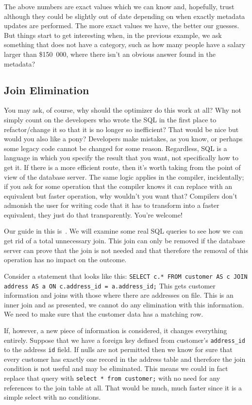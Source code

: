 \documentclass[a4paper]{report}
\begin{document}
The above numbers are exact values which we can know and, hopefully, trust although they could be slightly out of date depending on when exactly metadata updates are performed. The more exact values we have, the better our guesses. But things start to get interesting when, in the previous example, we ask something that does not have a category, such as how many people have a salary larger than \$150~000, where there isn't an obvious answer found in the metadata?

\subsection*{Join Elimination}

You may ask, of course, why should the optimizer do this work at all? Why not simply count on the developers who wrote the SQL in the first place to refactor/change it so that it is no longer so inefficient? That would be nice but would you also like a pony?  Developers make mistakes, as you know, or perhaps some legacy code cannot be changed for some reason. Regardless, SQL is a language in which you specify the result that you want, not specifically how to get it. If there is a more efficient route, then it's worth taking from the point of view of the database server. The same logic applies in the compiler, incidentally; if you ask for some operation that the compiler knows it can replace with an equivalent but faster operation, why wouldn't you want that? Compilers don't admonish the user for writing code that it has to transform into a faster equivalent, they just do that transparently. You're welcome!

Our guide in this is~\cite{joinelim}. We will examine some real SQL queries to see how we can get rid of a total unnecessary join. This join can only be removed if the database server can prove that the join is not needed and that therefore the removal of this operation has no impact on the outcome.


Consider a statement that looks like this: \texttt{SELECT c.* FROM customer AS c JOIN address AS a ON c.address\_id = a.address\_id;} This gets customer information and joins with those where there are addresses on file. This is an inner join and as presented, we cannot do any elimination with this information. We need to make sure that the customer data has a matching row.

If, however, a new piece of information is considered, it changes everything entirely. Suppose that we have a foreign key defined from customer's \texttt{address\_id} to the address \texttt{id} field. If nulls are not permitted then we know for sure that every customer has exactly one record in the address table and therefore the join condition is not useful and may be eliminated. This means we could in fact replace that query with \texttt{select * from customer;} with no need for any references to the join table at all. That would be much, much faster since it is a simple select with no conditions.
\end{document}
